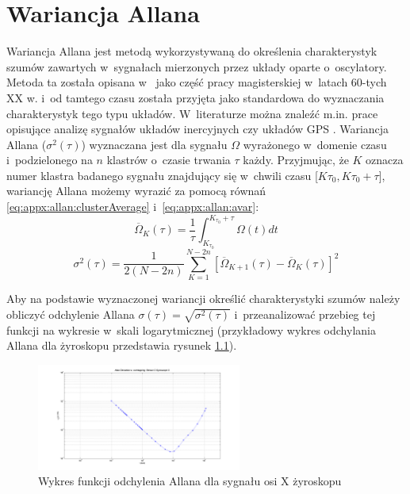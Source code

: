 \chapter{Wariancja Allana}\label{chap:appx:allan}
Wariancja Allana jest metodą wykorzystywaną do określenia charakterystyk szumów zawartych w~sygnałach mierzonych przez układy oparte o~oscylatory. Metoda ta została opisana w~\cite{Allan1966} jako część pracy magisterskiej w~latach 60-tych XX w. i~od tamtego czasu została przyjęta jako standardowa do wyznaczania charakterystyk tego typu układów. W~literaturze można znaleźć m.in. prace opisujące analizę sygnałów układów inercyjnych \cite{El-Sheimy2008, FreescaleSemiconductor2015} czy układów GPS \cite{Wright2007}. 
Wariancja Allana ($\sigma^2(\tau)$) wyznaczana jest dla sygnału $\Omega$ wyrażonego w~domenie czasu i~podzielonego na $n$ klastrów o~czasie trwania $\tau$ każdy. Przyjmując, że $K$ oznacza numer klastra badanego sygnału znajdujący się w~chwili czasu [$K\tau_0 , K\tau_0+\tau$], wariancję Allana możemy wyrazić za pomocą równań \eqref{eq:appx:allan:clusterAverage} i~\eqref{eq:appx:allan:avar}:
\begin{equation}
	\label{eq:appx:allan:clusterAverage}
	\overline{\Omega}_K(\tau) = \frac{1}{\tau}\int_{K_{\tau_0}}^{K_{\tau_0}+\tau}\Omega(t)dt
\end{equation}
\begin{equation}
	\label{eq:appx:allan:avar}
	\sigma^2(\tau) = \frac{1}{2(N-2n)}\sum_{K=1}^{N-2n}[\overline{\Omega}_{K+1}(\tau)-\overline{\Omega}_K(\tau)]^2
\end{equation}

Aby na podstawie wyznaczonej wariancji określić charakterystyki szumów należy obliczyć odchylenie Allana $\sigma(\tau) = \sqrt{\sigma^2(\tau)}$ i~przeanalizować przebieg tej funkcji na wykresie w~skali logarytmicznej (przykładowy wykres odchylania Allana dla żyroskopu przedstawia rysunek \ref{fig:appx:allan:deviationPlot}). 

\begin{figure}
	\centering
	\includegraphics[width=0.6\textwidth]{images/Allans2GyroXosig.png}
	\caption{Wykres funkcji odchylenia Allana dla sygnału osi X żyroskopu}
	\label{fig:appx:allan:deviationPlot}
\end{figure}

